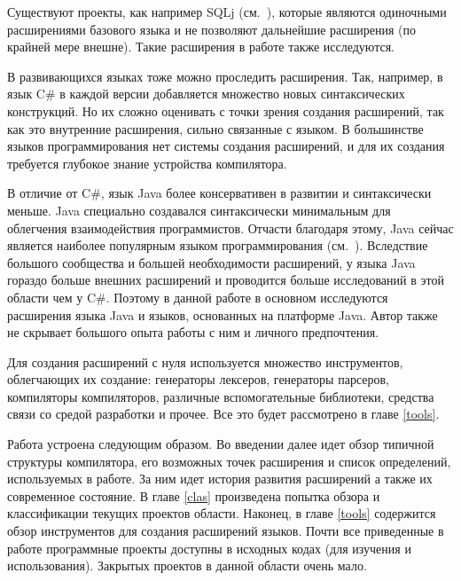 \documentclass[a4paper,12pt,titlepage]{extarticle}
\begin{document}
Существуют проекты, как например SQLj (см.~\cite{sqlj}), которые являются
одиночными расширениями базового языка и не позволяют дальнейшие расширения (по
крайней мере внешне). Такие расширения в работе также исследуются.

В развивающихся языках тоже можно проследить расширения. Так, например, в язык
C\# в каждой версии добавляется множество новых синтаксических конструкций. Но
их сложно оценивать с точки зрения создания расширений, так как это внутренние
расширения, сильно связанные с языком. В большинстве языков программирования
нет системы создания расширений, и для их создания требуется глубокое знание
устройства компилятора.

В отличие от C\#, язык Java более консервативен в развитии и синтаксически
меньше. Java специально создавался синтаксически минимальным для облегчения
взаимодействия программистов. Отчасти благодаря этому, Java сейчас
является наиболее популярным языком программирования (см.~\cite{tiobe}).
Вследствие большого сообщества и большей необходимости расширений, у языка Java
гораздо больше внешних расширений и проводится больше исследований в этой
области чем у C\#. Поэтому в данной работе в основном
исследуются расширения языка Java и языков, основанных на платформе Java. Автор
также не скрывает большого опыта работы с ним и личного предпочтения.

Для создания расширений с нуля используется множество инструментов, облегчающих
их создание: генераторы лексеров, генераторы парсеров, компиляторы
компиляторов, различные вспомогательные библиотеки, средства связи со средой
разработки и прочее. Все это будет рассмотрено в главе \ref{tools}.

Работа устроена следующим образом. Во введении далее идет обзор типичной
структуры компилятора, его возможных точек расширения и список определений,
используемых в работе. За ним идет история развития расширений а также
их современное состояние. В главе \ref{clas} произведена попытка обзора и
классификации текущих проектов области. Наконец, в главе \ref{tools} содержится
обзор инструментов для создания расширений языков. Почти все приведенные в
работе программные проекты доступны в исходных кодах (для изучения и
использования). Закрытых проектов в данной области очень мало.
\end{document}
